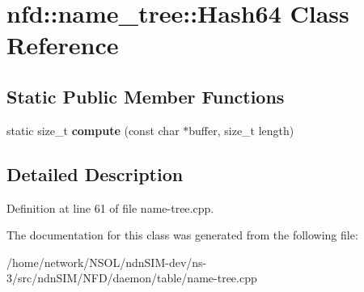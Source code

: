 \hypertarget{classnfd_1_1name__tree_1_1Hash64}{}\section{nfd\+:\+:name\+\_\+tree\+:\+:Hash64 Class Reference}
\label{classnfd_1_1name__tree_1_1Hash64}
\subsection*{Static Public Member Functions}
\begin{DoxyCompactItemize}
\item 
static size\+\_\+t {\bfseries compute} (const char $\ast$buffer, size\+\_\+t length)\hypertarget{classnfd_1_1name__tree_1_1Hash64_a4d3bf46a5700267c9943702e53c8046b}{}\label{classnfd_1_1name__tree_1_1Hash64_a4d3bf46a5700267c9943702e53c8046b}

\end{DoxyCompactItemize}


\subsection{Detailed Description}


Definition at line 61 of file name-\/tree.\+cpp.



The documentation for this class was generated from the following file\+:\begin{DoxyCompactItemize}
\item 
/home/network/\+N\+S\+O\+L/ndn\+S\+I\+M-\/dev/ns-\/3/src/ndn\+S\+I\+M/\+N\+F\+D/daemon/table/name-\/tree.\+cpp\end{DoxyCompactItemize}
